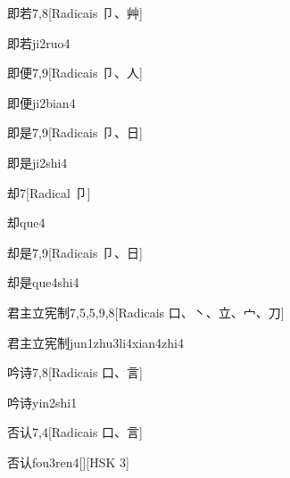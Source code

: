 \begin{entry}{即若}{7,8}[Radicais ⼙、⾋]
  \begin{phonetics}{即若}{ji2ruo4}
  \end{phonetics}
\end{entry}

\begin{entry}{即便}{7,9}[Radicais ⼙、⼈]
  \begin{phonetics}{即便}{ji2bian4}
  \end{phonetics}
\end{entry}

\begin{entry}{即是}{7,9}[Radicais ⼙、⽇]
  \begin{phonetics}{即是}{ji2shi4}
  \end{phonetics}
\end{entry}

\begin{entry}{却}{7}[Radical ⼙]
  \begin{phonetics}{却}{que4}
  \end{phonetics}
\end{entry}

\begin{entry}{却是}{7,9}[Radicais ⼙、⽇]
  \begin{phonetics}{却是}{que4shi4}
  \end{phonetics}
\end{entry}

\begin{entry}{君主立宪制}{7,5,5,9,8}[Radicais ⼝、⼂、⽴、⼧、⼑]
  \begin{phonetics}{君主立宪制}{jun1zhu3li4xian4zhi4}
  \end{phonetics}
\end{entry}

\begin{entry}{吟诗}{7,8}[Radicais ⼝、⾔]
  \begin{phonetics}{吟诗}{yin2shi1}
  \end{phonetics}
\end{entry}

\begin{entry}{否认}{7,4}[Radicais ⼝、⾔]
  \begin{phonetics}{否认}{fou3ren4}[][HSK 3]
  \end{phonetics}
\end{entry}

